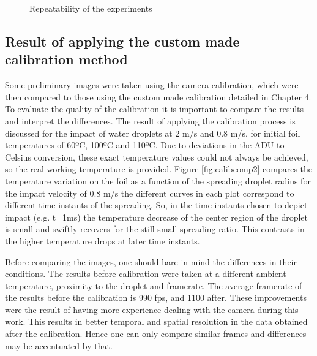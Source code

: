 \begin{figure}[h]
\centering

\caption{Repeatability of the experiments}
\label{fig:repeat}
\end{figure}

\subsection{Result of applying the custom made calibration method}

\par Some preliminary images were taken using the camera calibration, which were then compared to those using the custom made calibration detailed in Chapter 4. To evaluate the quality of the calibration it is important to compare the results and interpret the differences.  The result of applying the calibration process is discussed for the impact of water droplets at 2 m/s and 0.8 m/s, for initial foil temperatures of 60ºC, 100ºC and 110ºC. Due to deviations in the ADU to Celsius conversion, these exact temperature values could not always be achieved, so the real working temperature is provided. Figure \ref{fig:calibcomp2} compares the temperature variation on the foil as a function of the spreading droplet radius for the impact velocity of 0.8 m/s the different curves in each plot correspond to different time instants of the spreading. So, in the time instants chosen to depict impact (e.g. t=1ms) the temperature decrease of the center region of the droplet is small and swiftly recovers for the still small spreading ratio. This contrasts in the higher temperature drops at later time instants.\\

\par Before comparing the images, one should bare in mind the differences in their conditions. The results before calibration were taken at a different ambient temperature, proximity to the droplet and framerate. The average framerate of the results before the calibration is 990 fps, and 1100 after. These improvements were the result of having more experience dealing with the camera during this work. This results in better temporal and spatial resolution in the data obtained after the calibration. Hence one can only compare similar frames and differences may be accentuated by that. \\

